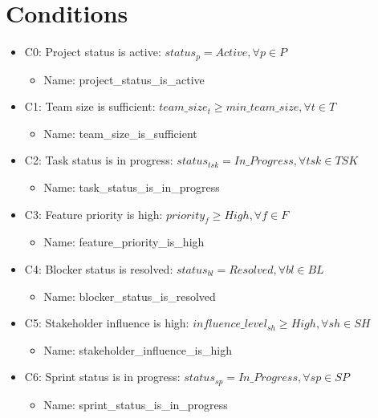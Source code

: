 \documentclass{article}
\begin{document}
\section{Conditions}
\begin{itemize}
    \item C0: Project status is active: $status_p = Active, \forall p \in P$
        \begin{itemize}
            \item Name: project\_status\_is\_active
        \end{itemize}
    \item C1: Team size is sufficient: $team\_size_t \geq min\_team\_size, \forall t \in T$
        \begin{itemize}
            \item Name: team\_size\_is\_sufficient
        \end{itemize}
    \item C2: Task status is in progress: $status_{tsk} = In\_Progress, \forall tsk \in TSK$
        \begin{itemize}
            \item Name: task\_status\_is\_in\_progress
        \end{itemize}
    \item C3: Feature priority is high: $priority_f \geq High, \forall f \in F$
        \begin{itemize}
            \item Name: feature\_priority\_is\_high
        \end{itemize}
    \item C4: Blocker status is resolved: $status_{bl} = Resolved, \forall bl \in BL$
        \begin{itemize}
            \item Name: blocker\_status\_is\_resolved
        \end{itemize}
    \item C5: Stakeholder influence is high: $influence\_level_{sh} \geq High, \forall sh \in SH$
        \begin{itemize}
            \item Name: stakeholder\_influence\_is\_high
        \end{itemize}
    \item C6: Sprint status is in progress: $status_{sp} = In\_Progress, \forall sp \in SP$
        \begin{itemize}
            \item Name: sprint\_status\_is\_in\_progress

\end{itemize}
\end{itemize}
\end{document}
